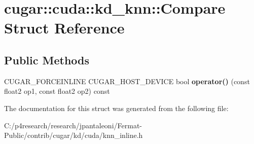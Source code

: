 \hypertarget{structcugar_1_1cuda_1_1kd__knn_1_1_compare}{}\section{cugar\+:\+:cuda\+:\+:kd\+\_\+knn\+:\+:Compare Struct Reference}
\label{structcugar_1_1cuda_1_1kd__knn_1_1_compare}
\subsection*{Public Methods}
\begin{DoxyCompactItemize}
\item 
\mbox{\label{structcugar_1_1cuda_1_1kd__knn_1_1_compare_a273ed860eb6bd37f7dc57c70885b3056}} 
C\+U\+G\+A\+R\+\_\+\+F\+O\+R\+C\+E\+I\+N\+L\+I\+NE C\+U\+G\+A\+R\+\_\+\+H\+O\+S\+T\+\_\+\+D\+E\+V\+I\+CE bool {\bfseries operator()} (const float2 op1, const float2 op2) const
\end{DoxyCompactItemize}


The documentation for this struct was generated from the following file\+:\begin{DoxyCompactItemize}
\item 
C\+:/p4research/research/jpantaleoni/\+Fermat-\/\+Public/contrib/cugar/kd/cuda/knn\+\_\+inline.\+h\end{DoxyCompactItemize}
